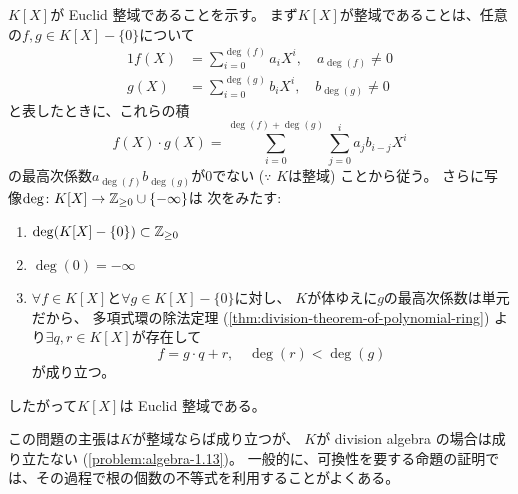 \documentclass[report]{jlreq}
\begin{document}

\begin{answer}
    $K[X]$が Euclid 整域であることを示す。
    まず$K[X]$が整域であることは、任意の$f, g \in K[X] - \{0\}$について
    \begin{alignat}{1}
        f(X) &= \sum_{i=0}^{\deg(f)} a_i X^i, \quad a_{\deg(f)} \neq 0 \\
        g(X) &= \sum_{i=0}^{\deg(g)} b_i X^i, \quad b_{\deg(g)} \neq 0
    \end{alignat}
    と表したときに、これらの積
    \begin{equation}
        f(X) \cdot g(X)
            = \sum_{i=0}^{\deg(f) + \deg(g)}
                \sum_{j=0}^i a_j b_{i-j} X^i
    \end{equation}
    の最高次係数$a_{\deg(f)} b_{\deg(g)}$が$0$でない
    ($\because$ $K$は整域) ことから従う。
    さらに写像$\operatorname{deg} \colon K[X] \to \mathbb{Z}_{\ge 0} \cup \{-\infty\}$は
    次をみたす:
    \begin{enumerate}
        \item $\operatorname{deg}(K[X] - \{0\}) \subset \mathbb{Z}_{\ge 0}$
        \item $\deg(0) = -\infty$
        \item $\forall f \in K[X]$と$\forall g \in K[X] - \{0\}$に対し、
            $K$が体ゆえに$g$の最高次係数は単元だから、
            多項式環の除法定理
            (\cref{thm:division-theorem-of-polynomial-ring})
            より$\exists q, r \in K[X]$が存在して
            \begin{equation}
                f = g \cdot q + r,\quad \deg(r) < \deg(g)
            \end{equation}
            が成り立つ。
    \end{enumerate}
    したがって$K[X]$は Euclid 整域である。
\end{answer}



\begin{remark}
    この問題の主張は$K$が整域ならば成り立つが、
    $K$が division algebra の場合は成り立たない (\cref{problem:algebra-1.13})。
    一般的に、可換性を要する命題の証明では、その過程で根の個数の不等式を利用することがよくある。
\end{remark}
\end{document}
